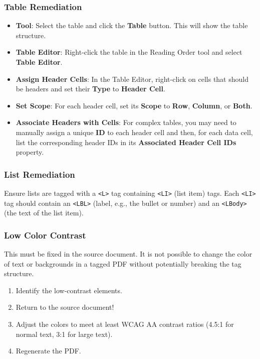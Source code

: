 \subsubsection{Table Remediation}
\label{ssubsec:table-remediation}
\begin{itemize}
	\item \textbf{ Tool}: Select the table and click the \textbf{Table} button. This will show the table structure.
	\item \textbf{Table Editor}: Right-click the table in the Reading Order tool and select \textbf{Table Editor}.
	\item \textbf{Assign Header Cells}: In the Table Editor, right-click on cells that should be headers and set their \textbf{Type} to \textbf{Header Cell}.
	\item \textbf{Set Scope}: For each header cell, set its \textbf{Scope} to \textbf{Row}, \textbf{Column}, or \textbf{Both}.
	\item \textbf{Associate Headers with Cells}: For complex tables, you may need to manually assign a unique \textbf{ID} to each header cell and then, for each data cell, list the corresponding header IDs in its \textbf{Associated Header Cell IDs} property.
\end{itemize}

\subsubsection{List Remediation}
\label{ssubsec:list-remediation}
Ensure lists are tagged with a \texttt{<L>} tag containing \texttt{<LI>} (list item) tags. Each \texttt{<LI>} tag should contain an \texttt{<LBL>} (label, e.g., the bullet or number) and an \texttt{<LBody>} (the text of the list item).

\subsubsection{Low Color Contrast}
\label{ssubsec:low-color-contrast-remediation}
This must be fixed in the source document. It is not possible to change the color of text or backgrounds in a tagged PDF without potentially breaking the tag structure.
\begin{enumerate}
	\item Identify the low-contrast elements.
	\item Return to the source document!
	\item Adjust the colors to meet at least WCAG AA contrast ratios (4.5:1 for normal text, 3:1 for large text).
	\item Regenerate the PDF.
\end{enumerate}


